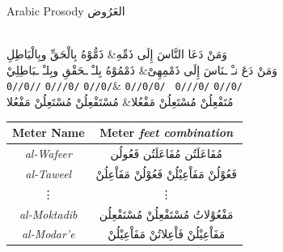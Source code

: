 %
%



\begin{frame}[fragile]{Arabic Prosody \textarabic{العَرُوض}}

\begin{Example}
	
\begin{center}
\begin{Arabic}
	\begin{traditionalpoem}
		\\
		وَمَنْ دَعَا النَّاسَ إِلَى ذَمِّهِ\quad & \quad ذَمُّوْهُ بِالْحَقِّ وبِالْبَاطِلِ\\
		{\color{purple} وَمَنْ دَعَ نـْ} {\color{blue} ـنَاسَ إِلَى} {\color{OliveGreen} ذَمْمِهِىْ}\quad & \quad
		{\color{purple} ذَمْمُوْهُ بِلـْ} {\color{blue} ـحَقْقِ وبِلـْ} {\color{OliveGreen} ـبَاطِلِيْ}\\
		{\color{purple} \texttt{0//0//}} {\color{blue} \texttt{0///0/}} {\color{OliveGreen} \texttt{0//0/}}\quad & \quad
		{\color{purple} \texttt{0//0/0/}} {\color{blue} \texttt{ 0///0/}} {\color{OliveGreen} \texttt{0//0/}}\\
		{\color{purple} مُتَفْعِلُنْ} {\color{blue} مُسْتَعِلُنْ} {\color{OliveGreen} مَفْعُلا}\quad & \quad
		{\color{purple} مُسْتَفْعِلُنْ} {\color{blue} مُسْتَعِلُنْ} {\color{OliveGreen} مَفْعُلا}
	\end{traditionalpoem}
\end{Arabic}
\end{center}

\end{Example}

\begin{center}
\begin{tabular}[h!]{|c|c|} 
\hline
\textbf{Meter Name} & \textbf{Meter} \small{\textit{feet combination}} \\ 
\hline
\textit{al-Wafeer}    & \textarabic{مُفَاعَلَتُن مُفَاعَلَتُن فَعُولُن} \\ %
\textit{al-Taweel}    & \textarabic{فَعُوْلُنْ مَفَاْعِيْلُنْ فَعُوْلُنْ مَفَاْعِلُنْ} \\ %
\vdots                &  \vdots\\
\textit{al-Moktadib}  & \textarabic{مَفْعُوْلاتُ مُسْتَفْعِلُنْ مُسْتَفْعِلُن} \\
\textit{al-Modar'e}   & \textarabic{مَفَاْعِيْلُنْ فَاْعِلاتُنْ مَفَاْعِيْلُنْ} \\
\hline
\end{tabular}
\end{center}
\end{frame}
